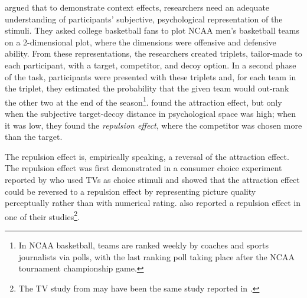 \textcite{fang2024context} argued that to demonstrate context effects, researchers need an adequate understanding of participants' subjective, psychological representation of the stimuli. They asked college basketball fans to plot NCAA men's basketball teams on a 2-dimensional plot, where the dimensions were offensive and defensive ability. From these representations, the researchers created triplets, tailor-made to each participant, with a target, competitor, and decoy option. In a second phase of the task, participants were presented with these triplets and, for each team in the triplet, they estimated the probability that the given team would out-rank the other two at the end of the season\footnote{In NCAA basketball, teams are ranked weekly by coaches and sports journalists via polls, with the last ranking poll taking place after the NCAA tournament championship game.}. \textcite{fang2024context} found the attraction effect, but only when the subjective target-decoy distance in psychological space was high; when it was low, they found the \textit{repulsion effect}, where the competitor was chosen more than the target.

The repulsion effect is, empirically speaking, a reversal of the attraction effect. The repulsion effect was first demonstrated in a consumer choice experiment reported by \textcite{frederick2008attraction} who used TVs as choice stimuli and showed that the attraction effect could be reversed to a repulsion effect by representing picture quality perceptually rather than with numerical rating. \textcite{frederickLimitsAttraction2014b} also reported a repulsion effect in one of their studies\footnote{The TV study from \textcite{frederick2008attraction} may have been the same study reported in \textcite{frederickLimitsAttraction2014b}.}. 

